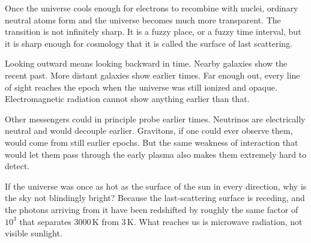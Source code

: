 Once the universe cools enough for electrons to recombine with nuclei, ordinary neutral atoms form and the universe becomes much more transparent. The transition is not infinitely sharp. It is a fuzzy place, or a fuzzy time interval, but it is sharp enough for cosmology that it is called the surface of last scattering.

Looking outward means looking backward in time. Nearby galaxies show the recent past. More distant galaxies show earlier times. Far enough out, every line of sight reaches the epoch when the universe was still ionized and opaque. Electromagnetic radiation cannot show anything earlier than that.

Other messengers could in principle probe earlier times. Neutrinos are electrically neutral and would decouple earlier. Gravitons, if one could ever observe them, would come from still earlier epochs. But the same weakness of interaction that would let them pass through the early plasma also makes them extremely hard to detect.

If the universe was once as hot as the surface of the sun in every direction, why is the sky not blindingly bright? Because the last-scattering surface is receding, and the photons arriving from it have been redshifted by roughly the same factor of \(10^3\) that separates \(3000\,\mathrm K\) from \(3\,\mathrm K\). What reaches us is microwave radiation, not visible sunlight.

\begin{classroomqa}
\end{classroomqa}

\begin{classroomqa}
\end{classroomqa}

